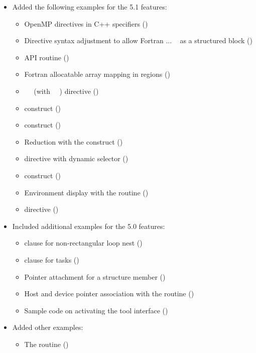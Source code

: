 \begin{itemize}
\item Added the following examples for the 5.1 features:
\begin{itemize}
  \item OpenMP directives in C++  specifiers
    ()
  \item Directive syntax adjustment to allow Fortran  ... 
    ~ as a structured block 
      ()
  \item {} API routine
      ()
  \item Fortran allocatable array mapping in  regions ()
  \item {}~~ (with
        ~~) directive
      ()
  \item {} construct             ()
  \item {} construct           ()
  \item Reduction with the  construct
      ()
  \item  {} directive with dynamic  selector
      ()
  \item {} construct  ()
  \item Environment display with the  routine
      ()
  \item {} directive  ()
\end{itemize}

\item Included additional examples for the 5.0 features:
\begin{itemize}
  \item {} clause for non-rectangular loop nest
      ()
  \item {} clause for tasks ()
  \item Pointer attachment for a structure member ()
  \item Host and device pointer association with the  routine ()
  
  \item Sample code on activating the tool interface 
      ()
\end{itemize}

\item Added other examples:
\begin{itemize}
  \item The  routine ()
\end{itemize}
\end{itemize}



